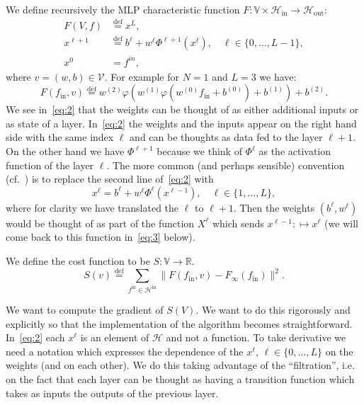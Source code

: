 \documentclass[10pt, a4paper]{article}
\theoremstyle{plain}
\theoremstyle{definition}
\theoremstyle{definition}
\theoremstyle{definition}
\theoremstyle{definition}
\theoremstyle{definition}
\theoremstyle{definition}
\theoremstyle{definition}
\theoremstyle{remark}
\theoremstyle{remark}
\theoremstyle{rudin-style-generic}
\theoremstyle{rudin-style-generic*}
\theoremstyle{rudin-style-theorem}
\newcommand{\deq}{\stackrel{\mathrm{def}}{=}}
\newcommand{\RR}{\mathbb R}
\newcommand*{\fin}{{f^{\text{in}}}}
\begin{document}
  We define recursively the MLP characteristic  function
  $F:\mathbb V\times \mathcal  H_{\text{in}}\rightarrow \mathcal H_{\text{out}}$:
  \begin{equation}
    \label{eq:2}
    \begin{aligned}
      F(V,f) &\deq x^{L} , \\
      x^{\ell+1} &\deq b^\ell + w^\ell \Phi^{\ell+1} ( x^\ell ),\quad \ell \in \{ 0,\dots , L-1\} , \\
      x^{0} &= f^{in},
    \end{aligned}
  \end{equation}
  where $v=(w,b)\in\mathcal V$.
  For example for $N=1$ and $L=3$ we have:
  $$
  F(f_{\text{in}},v) \deq  w^{(2)} \varphi( w^{(1)} \varphi( w^{(0)} f_{\text{in}} + b^{(0)} ) + b^{(1)} ) + b^{(2)} 
  .
  $$
  We see in~\eqref{eq:2}  that the weights can be thought of as either additional inputs or as state of a layer.
  In~\eqref{eq:2} the weights and the inputs appear on the right hand side with the same index $\ell$ and can be thoughts as data fed to the layer $\ell+1$.
  On the other hand we have $\Phi^{\ell+1}$ because we think of $\Phi^\ell$ as the activation function of the layer $\ell$.
  The more common (and perhaps sensible) convention (cf.~\cite{goodfellowDeepLearning2016}) is to replace the second line of~\eqref{eq:2} with
  $$
  x^{\ell} = b^{\ell} + w^{\ell} \Phi^\ell ( x^{\ell-1} ),\quad \ell \in \{ 1,\dots , L\}
  ,
  $$
  where for clarity we have translated the $\ell$ to $\ell+1$.
  Then the weights $(b^{\ell},w^{\ell})$ would be thought of as part of the function $X^{\ell}$ which sends $x^{\ell-1}:\mapsto x^{\ell}$
  (we will come back to this function in~\eqref{eq:3} below).
  
  We define the cost function to be $S:\mathbb V \rightarrow\RR$.
  $$
  S(v) \deq \sum_{\fin\in\mathcal H^{\text{in}}} \|F(f_{\text{in}},v) - F_{\infty}(f_{\text{in}} ) \|^2
  .
  $$

  We want to compute the gradient of $S(V) $.
  We want to do this rigorously and explicitly so that the implementation of the algorithm becomes straightforward.
  In~\eqref{eq:2} each $x^{\ell}$ is an element of $\mathcal H$  and not a function.
  To take derivative we need a notation which expresses the dependence of the $x^{\ell}$, $\ell\in\{0,\dots,L\}$ on the weights (and on each other).
  We do this taking advantage of the ``filtration'', i.e. on the fact that each layer can be thought as having a transition function
  which takes as inputs the outputs of the previous layer.
  
\end{document}
